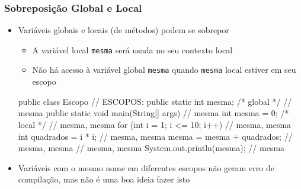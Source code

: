 \documentclass[xcolor={dvipsnames,table},aspectratio=169]{beamer}
\begin{document}
\begin{frame}[fragile]\frametitle{Sobreposição Global e Local}
\begin{itemize}
	\item Variáveis globais e locais (de métodos) podem se sobrepor
	\begin{itemize}
		\item A variável local \texttt{mesma} será usada no seu contexto local
		\item Não há acesso à variável global \texttt{mesma} quando \texttt{mesma} local estiver em seu escopo
	\end{itemize}
{\scriptsize
\begin{javacode}
public class Escopo {                       // ESCOPOS:
  public static int mesma; /* global */     // mesma
  public static void main(String[] args) {  // mesma
    int mesma = 0; /* local */              // mesma, mesma
    for (int i = 1; i <= 10; i++) {         // mesma, mesma
      int quadrados = i * i;                // mesma, mesma
      mesma = mesma + quadrados;            // mesma, mesma
    }                                       // mesma, mesma
    System.out.println(mesma);              // mesma
  }
}
\end{javacode}
}
	\item Variáveis com o mesmo nome em diferentes escopos não geram erro de compilação, mas não é uma boa ideia fazer isto
\end{itemize}
\end{frame}
\end{document}
